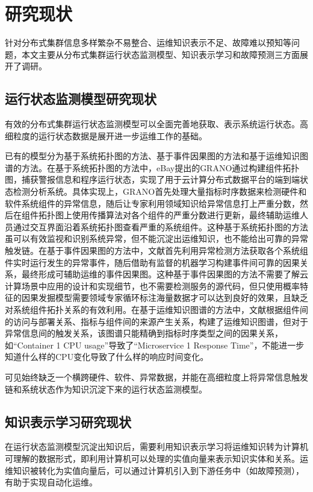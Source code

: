 \section{研究现状}
针对分布式集群信息多样繁杂不易整合、运维知识表示不足、故障难以预知等问题，本文主要从分布式集群运行状态监测模型、知识表示学习和故障预测三方面展开了调研。

\subsection{运行状态监测模型研究现状}
有效的分布式集群运行状态监测模型可以全面完善地获取、表示系统运行状态。高细粒度的运行状态数据是展开进一步运维工作的基础。

已有的模型分为基于系统拓扑图的方法、基于事件因果图的方法和基于运维知识图谱的方法。在基于系统拓扑图的方法中，eBay提出的GRANO\cite{wang2019grano}通过构建组件拓扑图，捕获警报信息和程序运行状态，实现了用于云计算分布式数据平台的端到端状态检测分析系统。具体实现上，GRANO首先处理大量指标时序数据来检测硬件和软件系统组件的异常信息，随后让专家利用领域知识给异常信息打上严重分数，然后在组件拓扑图上使用传播算法对各个组件的严重分数进行更新，最终辅助运维人员通过交互界面沿着系统拓扑图查看严重的系统组件。这种基于系统拓扑图的方法虽可以有效监视和识别系统异常，但不能沉淀出运维知识，也不能给出可靠的异常触发链。在基于事件因果图的方法中，文献\parencite{nie2016mining-causality-graph}首先利用异常检测方法\cite{nguyen2011pal}获取各个系统组件实时运行发生的异常事件，随后借助有监督的机器学习\cite{breiman2001randomforest}构建事件间可靠的因果关系，最终形成可辅助运维的事件因果图。这种基于事件因果图的方法不需要了解云计算场景中应用的设计和实现细节，也不需要检测服务的源代码，但只使用概率特征的因果发掘模型需要领域专家循环标注海量数据才可以达到良好的效果，且缺乏对系统组件拓扑关系的有效利用。在基于运维知识图谱的方法中，文献\parencite{qiu2020causality-mining-knowledge-graph}根据组件间的访问与部署关系、指标与组件间的来源产生关系，构建了运维知识图谱，但对于异常信息间的触发关系，该图谱只能精确到指标时序类型之间的因果关系，如“Container 1 CPU usage”导致了“Microservice 1 Response Time”\cite{qiu2020causality-mining-knowledge-graph}，不能进一步知道什么样的CPU变化导致了什么样的响应时间变化。

可见始终缺乏一个横跨硬件、软件、异常数据，并能在高细粒度上将异常信息触发链和系统状态作为知识沉淀下来的运行状态监测模型。

\subsection{知识表示学习研究现状}
在运行状态监测模型沉淀出知识后，需要利用知识表示学习将运维知识转为计算机可理解的数据形式，即利用计算机可以处理的实值向量来表示知识实体和关系。运维知识被转化为实值向量后，可以通过计算机引入到下游任务中（如故障预测），有助于实现自动化运维。

